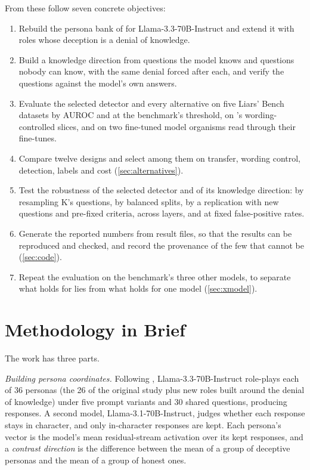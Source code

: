 From these follow seven concrete objectives:
\begin{enumerate}[leftmargin=1.6em, itemsep=2pt]
\item Rebuild the persona bank of \textcite{mahadik2026persona} for Llama-3.3-70B-Instruct and extend
  it with roles whose deception is a denial of knowledge.
\item Build a knowledge direction from questions the model knows and questions nobody can know, with
  the same denial forced after each, and verify the questions against the model's own answers.
\item Evaluate the selected detector and every alternative on five Liars' Bench datasets by AUROC and
  at the benchmark's threshold, on \hpkr's wording-controlled slices, and on two fine-tuned model
  organisms read through their fine-tunes.
\item Compare twelve designs and select among them on transfer, wording control, detection, labels
  and cost (\cref{sec:alternatives}).
\item Test the robustness of the selected detector and of its knowledge direction: by resampling K's
  questions, by balanced splits, by a replication with new questions and pre-fixed criteria, across
   layers, and at fixed false-positive rates.
\item Generate the reported numbers from result files, so that the results can be reproduced and
  checked, and record the provenance of the few that cannot be (\cref{sec:code}).
\item Repeat the evaluation on the benchmark's three other models, to separate what holds for lies from
  what holds for one model (\cref{sec:xmodel}).
\end{enumerate}

\section{Methodology in Brief}
\label{sec:method-brief}

The work has three parts.

\emph{Building persona coordinates.} Following \textcite{mahadik2026persona}, Llama-3.3-70B-Instruct
role-plays each of 36 personas (the 26 of the original study plus  new roles built around
the denial of knowledge) under five prompt variants and 30 shared questions, producing
 responses. A second model, Llama-3.1-70B-Instruct, judges whether each response
stays in character, and only in-character responses are kept. Each persona's vector is the model's
mean residual-stream activation over its kept responses, and a \emph{contrast direction} is the
difference between the mean of a group of deceptive personas and the mean of a group of honest ones.

